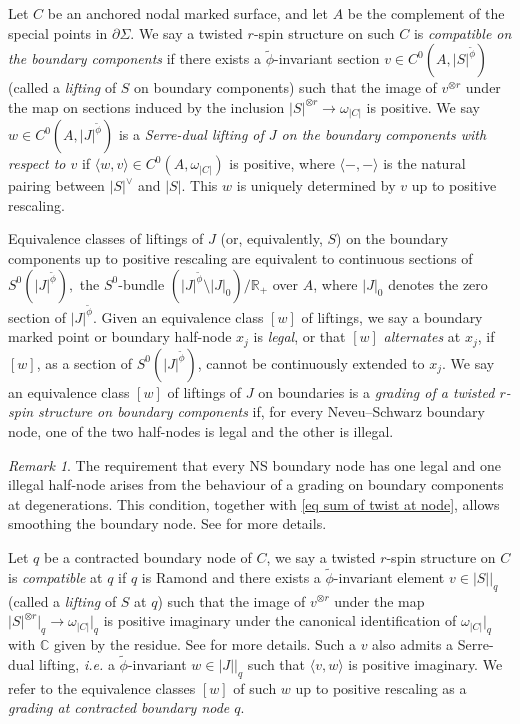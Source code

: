 \documentclass[11pt]{amsart}
\theoremstyle{definition}
\theoremstyle{remark}
\newtheorem{rmk}[dummy]{Remark}
\newcommand{\<}{\left<}
\renewcommand{\>}{\right>}
\numberwithin{equation}{section}
\begin{document}
Let $C$ be an anchored nodal marked surface, and let $A$ be the complement of the special points in $\partial \Sigma$.  We say a twisted $r$-spin structure on such $C$ is \textit{compatible on the boundary components} if there exists a $\widetilde{\phi}$-invariant section $v \in C^0\left(A, |S|^{\widetilde{\phi}}\right)$ (called a \textit{lifting} of $S$  on boundary components) such that the image of $v^{\otimes r}$ under the map on sections induced by the inclusion $|S|^{\otimes r} \to  \omega_{|C|}$ is positive.  We say $w \in C^0\left(A, |J|^{\widetilde{\phi}}\right)$ is a \textit{Serre-dual lifting of $J$ on the boundary components with respect to $v$} if $\langle w, v \rangle \in C^0(A, \omega_{|C|})$ is positive, where $\langle -, - \rangle$ is the natural pairing between $|S|^{\vee}$ and $|S|$.  This $w$ is uniquely determined by $v$ up to positive rescaling.

 Equivalence classes of liftings of %
$J$ (or, equivalently, %
$S$) on the boundary components up to positive rescaling are equivalent to continuous sections of $S^0(|J|^{\widetilde\phi}),$ the $S^0$-bundle $\left(|J|^{\widetilde{\phi}}\setminus |J|_0\right)\big/ \mathbb R_+$ over $A$, where $|J|_0$ denotes the zero section of $|J|^{\widetilde{\phi}}$. Given an equivalence class $[w]$  of liftings, we say a boundary marked point or boundary half-node $x_j$ is \textit{legal}, or that $[w]$ \textit{alternates} at $x_j$, if $[w]$, as a section of $S^0(|J|^{\widetilde\phi})$, cannot be continuously extended to $x_j$.
We say an equivalence class $[w]$ of liftings of $J$ on boundaries is a \textit{grading of a twisted $r$-spin structure on boundary components} if, for every Neveu--Schwarz boundary node, one of the two half-nodes is legal and the other is illegal. 
\begin{rmk}
    The requirement that every NS boundary node has one legal and one illegal half-node arises from the behaviour of a grading on boundary components at degenerations. This condition, together %
with \eqref{eq sum of twist at node}, allows %
smoothing the boundary node. See \cite{BCT1} for more details.
\end{rmk}

Let $q$ be a contracted boundary node of $C$, we say a twisted $r$-spin structure on $C$ is \textit{compatible} at $q$ if $q$ is Ramond and there exists a $\widetilde{\phi}$-invariant element $v \in |S|\big|_q$  (called a \textit{lifting} of $S$ at $q$) such that the image of $v^{\otimes r}$ under the map $|S|^{\otimes r}\big|_q \to \omega_{|C|}\big|_q$ is positive imaginary under the canonical identification of $\omega_{|C|}\big|_q$ with ${\mathbb{C}}$ given by the residue. See \cite[Definition 2.8]{BCT1} for more details.  Such a $v$ also admits a Serre-dual lifting, \textit{i.e.}  a $\widetilde{\phi}$-invariant $w \in |J|\big\vert_q$ such that $\langle v, w \rangle$ is positive imaginary.  We refer to the equivalence classes $[w]$ of such $w$ up to positive rescaling as a \textit{grading at contracted boundary node $q$}.
\end{document}
